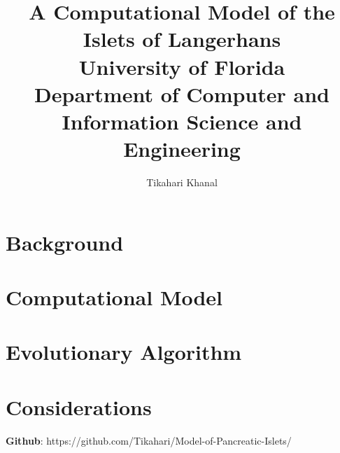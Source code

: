 \documentclass[12pt]{article}
\title{
{A Computational Model of the Islets of Langerhans}\\
{\large University of Florida\\ Department of Computer and Information Science and Engineering}
}
\author{Tikahari Khanal}
\begin{document}
\begin{titlingpage}\setlength{\droptitle}{30pt} %
	\maketitle
	\begin{abstract}
	
	\end{abstract}
\end{titlingpage}

\tableofcontents
\newpage
\renewcommand{\listfigurename}{Figures}
\listoffigures
\newpage

\section{Background}


\section{Computational Model}


\section{Evolutionary Algorithm}


\section{Considerations}

\clearpage
\printbibliography

\textbf{Github}: https://github.com/Tikahari/Model-of-Pancreatic-Islets/
\end{document}
